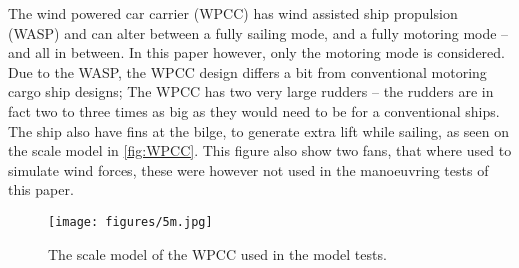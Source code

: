 The wind powered car carrier (WPCC) has wind assisted ship propulsion (WASP) and can alter between a fully sailing mode, and a fully motoring mode -- and all in between. 
In this paper however, only the motoring mode is considered. Due to the WASP, the WPCC design differs a bit from conventional motoring cargo ship designs; The WPCC has two very large rudders -- the rudders are in fact two to three times as big as they would need to be for a conventional ships. The ship also have fins at the bilge, to generate extra lift while sailing, as seen on the scale model in \autoref{fig:WPCC}. This figure also show two fans, that where used to simulate wind forces, these were however not used in the manoeuvring tests of this paper.
\begin{figure}[h]
    \centering
    \texttt{[image: figures/5m.jpg]}
    \caption{The scale model of the WPCC used in the model tests.}
    \label{fig:WPCC}
\end{figure}